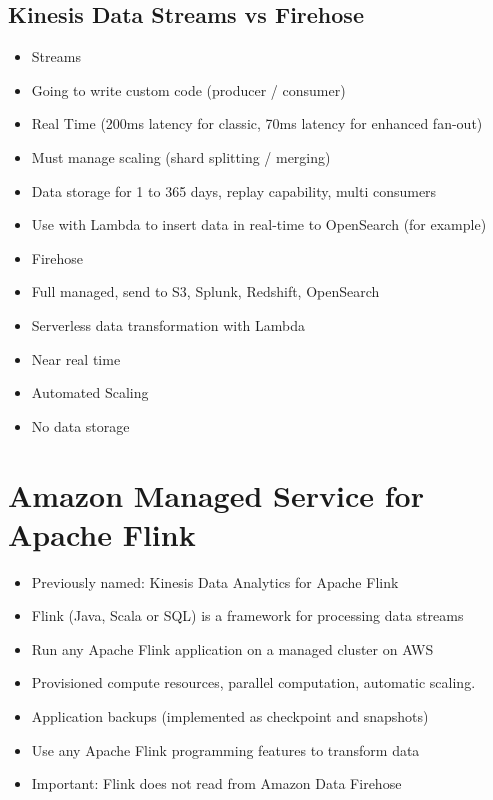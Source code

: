 \subsection{Kinesis Data Streams vs Firehose}
\begin{itemize}
    \item Streams
    \item Going to write custom code (producer / consumer)
    \item Real Time (200ms latency for classic, 70ms latency for enhanced fan-out)
    \item Must manage scaling (shard splitting / merging)
    \item Data storage for 1 to 365 days, replay capability, multi consumers
    \item Use with Lambda to insert data in real-time to OpenSearch (for example)
    \item Firehose
    \item Full managed, send to S3, Splunk, Redshift, OpenSearch
    \item Serverless data transformation with Lambda
    \item Near real time
    \item Automated Scaling
    \item No data storage
\end{itemize}


\section{Amazon Managed Service for Apache Flink}
\begin{itemize}
    \item Previously named: Kinesis Data Analytics for Apache Flink
    \item Flink (Java, Scala or SQL) is a framework for processing data streams
    \item Run any Apache Flink application on a managed cluster on AWS
    \item Provisioned compute resources, parallel computation, automatic scaling.
    \item Application backups (implemented as checkpoint and snapshots)
    \item Use any Apache Flink programming features to transform data
    \item Important: Flink does not read from Amazon Data Firehose
\end{itemize}


